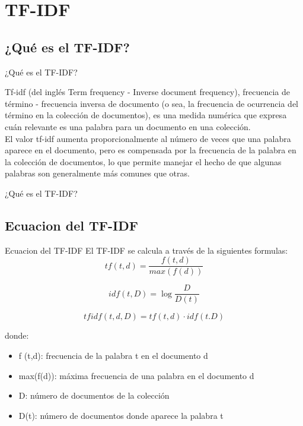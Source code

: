 \section{TF-IDF}\label{sec:tfidf}

\subsection{¿Qué es el TF-IDF?}
\begin{frame}{¿Qué es el TF-IDF?}
	\begin{center}
		Tf-idf (del inglés Term frequency - Inverse document frequency), frecuencia de término - 
		frecuencia inversa de documento (o sea, la frecuencia de ocurrencia del término en la colección de documentos),
		es una medida numérica que expresa cuán relevante es una palabra para un documento en una colección.\\
		\pause
		\vspace*{1cm}
		El valor tf-idf aumenta proporcionalmente al número de veces que una palabra aparece en el documento, 
		pero es compensada por la frecuencia de la palabra en la colección de documentos, lo que permite 
		manejar el hecho de que algunas palabras son generalmente más comunes que otras.
	\end{center}
\end{frame}

\begin{frame}{¿Qué es el TF-IDF?}
	
\end{frame}

\subsection{Ecuacion del TF-IDF}
\begin{frame}{Ecuacion del TF-IDF}
	El TF-IDF se calcula a través de la siguientes formulas:
	\begin{equation}
		tf(t,d) = \frac{f(t,d)}{max(f(d))}
	\end{equation}
	
	\begin{equation}
		idf(t,D) = \log\frac{D}{D(t)}
	\end{equation}
	
	\begin{equation}
		tfidf(t,d,D) = tf(t,d) \cdot idf(t.D)
	\end{equation}
	
	donde:
	\begin{itemize}
		\item f (t,d): frecuencia de la palabra t en el documento d 
		\item max(f(d)): máxima frecuencia de una palabra en el documento d
		\item D: número de documentos de la colección 
		\item D(t): número de documentos donde aparece la palabra t
	\end{itemize}
\end{frame}

